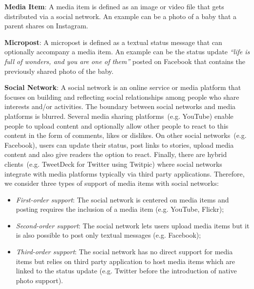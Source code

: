 \documentclass{acm_proc_article-sp}
\let\oldemph\emph
\renewcommand{\emph}[1]{\oldemph{\fontsize{9}{9}\selectfont #1}}
\begin{document}
\textbf{Media Item}: A media item is defined as an image or video file that gets distributed via a social network. An example can be a photo of a baby that 
a parent shares on Instagram.

\textbf{Micropost}: A micropost is defined as a textual status message that can optionally accompany a media item. An example can be the status update
\emph{``life is full of wonders, and you are one of them''} posted on Facebook that contains the previously shared photo of the baby.

\textbf{Social Network}: A social network is an online service or media platform that focuses on building and reflecting social relationships among
people who share interests and/or activities. The boundary between social networks and media platforms is blurred.
Several media sharing platforms~(e.g. YouTube) enable people to upload content and optionally allow other people to react
to this content in the form of comments, likes or dislikes. On other social networks~(e.g. Facebook), users can update their status,
post links to stories, upload media content and also give readers the option to react. Finally, there are hybrid clients~(e.g. TweetDeck
for Twitter using Twitpic) where social networks integrate with media platforms typically via third party applications. 
Therefore, we consider three types of support of media items with social networks:
\begin{itemize}
  \item \emph{First-order support}: The social network is centered on media items and posting requires the inclusion of a media item (e.g. YouTube, Flickr);
  \item \emph{Second-order support}: The social network lets users upload media items but it is also possible to post only textual messages (e.g. Facebook);
  \item \emph{Third-order support}: The social network has no direct support for media items but relies on third party application to host media items
  which are linked to the status update (e.g. Twitter before the introduction of native photo support).
\end{itemize}
\end{document}
